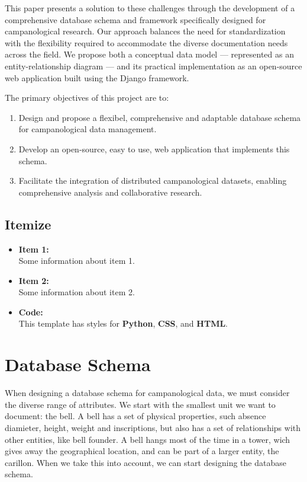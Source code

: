 \documentclass[11pt, a4paper]{article}
\begin{document}
This paper presents a solution to these challenges through the development of a comprehensive database schema and 
framework specifically designed for campanological research. Our approach balances the need for standardization 
with the flexibility required to accommodate the diverse documentation needs across the field. We propose both a 
conceptual data model — represented as an entity-relationship diagram — and its practical implementation as an 
open-source web application built using the Django framework.

The primary objectives of this project are to:
\begin{enumerate}
    \item Design and propose a flexibel, comprehensive and adaptable database schema for campanological data management.
    \item Develop an open-source, easy to use, web application that implements this schema.
    \item Facilitate the integration of distributed campanological datasets, enabling comprehensive analysis and collaborative research.
\end{enumerate}

\subsection{Itemize}

\begin{itemize}
    \item \textbf{Item 1:} \\
        Some information about item 1.
    \item \textbf{Item 2:} \\
        Some information about item 2.
    \item \textbf{Code: } \\
        This template has styles for \textbf{Python}, \textbf{CSS}, and \textbf{HTML}.
\end{itemize}
    
\section{Database Schema}

When designing a database schema for campanological data, we must consider the diverse range of attributes.
We start with the smallest unit we want to document: the bell. A bell has a set of physical properties, such absence
diamieter, height, weight and inscriptions, but also has a set of relationships with other entities, like bell founder. 
A bell hangs most of the time in a tower, wich gives away the geographical location, and can be part of a larger entity, the carillon. 
When we take this into account, we can start designing the database schema.
\end{document}

